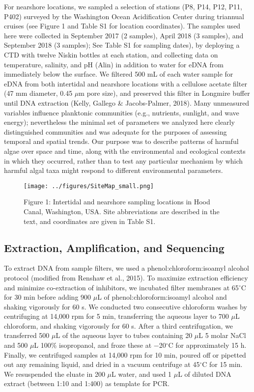 \documentclass[
]{article}
\begin{document}
For nearshore locations, we sampled a selection of stations (P8, P14,
P12, P11, P402) surveyed by the Washington Ocean Acidification Center
during triannual cruises (see Figure 1 and Table S1 for location
coordinates). The samples used here were collected in September 2017 (2
samples), April 2018 (3 samples), and September 2018 (3 samples); See
Table S1 for sampling dates), by deploying a CTD with twelve Niskin
bottles at each station, and collecting data on temperature, salinity,
and pH (Alin) in addition to water for eDNA from immediately below the
surface. We filtered 500 mL of each water sample for eDNA from both
intertidal and nearshore locations with a cellulose acetate filter (47
mm diameter, 0.45 \(\mu\)m pore size), and preserved this filter in
Longmire buffer until DNA extraction (Kelly, Gallego \& Jacobs-Palmer,
2018). Many unmeasured variables influence planktonic communities (e.g.,
nutrients, sunlight, and wave energy); nevertheless the minimal set of
parameters we analyzed here clearly distinguished communities and was
adequate for the purposes of assessing temporal and spatial trends. Our
purpose was to describe patterns of harmful algae over space and time,
along with the environmental and ecological contexts in which they
occurred, rather than to test any particular mechanism by which harmful
algal taxa might respond to different environmental parameters.

\begin{figure}
\centering
\texttt{[image: ../figures/SiteMap\_small.png]}
\caption{\label{fig:sitemap} Figure 1: Intertidal and nearshore sampling
locations in Hood Canal, Washington, USA. Site abbreviations are
described in the text, and coordinates are given in Table S1.}
\end{figure}

\hypertarget{extraction-amplification-and-sequencing}{%
\subsection{Extraction, Amplification, and
Sequencing}\label{extraction-amplification-and-sequencing}}

To extract DNA from sample filters, we used a phenol:chloroform:isoamyl
alcohol protocol (modified from Renshaw et al., 2015). To maximize
extraction efficiency and minimize co-extraction of inhibitors, we
incubated filter membranes at 65\(^\circ\)C for 30 min before adding 900
\(\mu\)L of phenol:chloroform:isoamyl alcohol and shaking vigorously for
60 s. We conducted two consecutive chloroform washes by centrifuging at
14,000 rpm for 5 min, transferring the aqueous layer to 700 \(\mu\)L
chloroform, and shaking vigorously for 60 s. After a third
centrifugation, we transferred 500 \(\mu\)L of the aqueous layer to
tubes containing 20 \(\mu\)L 5 molar NaCl and 500 \(\mu\)L 100\%
isopropanol, and froze these at −20\(^\circ\)C for approximately 15 h.
Finally, we centrifuged samples at 14,000 rpm for 10 min, poured off or
pipetted out any remaining liquid, and dried in a vacuum centrifuge at
45\(^\circ\)C for 15 min. We resuspended the eluate in 200 \(\mu\)L
water, and used 1 \(\mu\)L of diluted DNA extract (between 1:10 and
1:400) as template for PCR.
\end{document}
